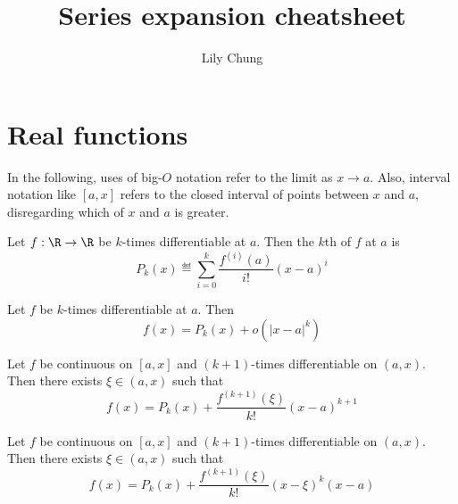 \documentclass{article}
\title{Series expansion cheatsheet}
\author{Lily Chung}
\date{}
\begin{document}
\maketitle

\section*{Real functions}

In the following, uses of big-$O$ notation refer to the limit as $x \to a$.
Also, interval notation like $[a, x]$ refers to the closed interval of points between $x$ and $a$, disregarding which of $x$ and $a$ is greater.

\begin{tcolorbox}
  \begin{definition}
    Let $f : \R \to \R$ be $k$-times differentiable at $a$.  Then the $k$th  of $f$ at $a$ is
    \[P_k(x) \eqdef \sum_{i=0}^k \frac{f^{(i)}(a)}{i!} (x - a)^i\]
  \end{definition}
\end{tcolorbox}

\begin{tcolorbox}
  \begin{theorem}[Taylor]
    Let $f$ be $k$-times differentiable at $a$.
    Then
    \[f(x) = P_k(x) + o\left(|x - a|^k\right)\]
  \end{theorem}
\end{tcolorbox}


\begin{theorem}
  Let $f$ be continuous on $[a, x]$ and $(k+1)$-times differentiable on $(a, x)$.
  Then there exists $\xi \in (a, x)$ such that
  \[f(x) = P_k(x) + \frac{f^{(k+1)}(\xi)}{k!} (x - a)^{k+1}\]
\end{theorem}

\begin{theorem}
  Let $f$ be continuous on $[a, x]$ and $(k+1)$-times differentiable on $(a, x)$.
  Then there exists $\xi \in (a, x)$ such that
  \[f(x) = P_k(x) + \frac{f^{(k+1)}(\xi)}{k!} (x - \xi)^k (x - a)\]
\end{theorem}
\end{document}

